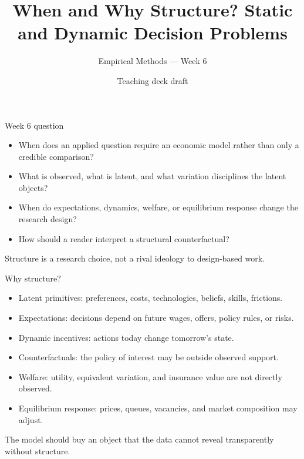 \documentclass[aspectratio=169,11pt]{beamer}
\title{When and Why Structure? Static and Dynamic Decision Problems}
\subtitle{Empirical Methods --- Week 6}
\author{Teaching deck draft}
\date{}
\newcommand{\1}{\mathbf{1}}
\begin{document}
\begin{frame}
  \titlepage
\end{frame}

\begin{frame}{Week 6 question}
\begin{itemize}
    \item When does an applied question require an economic model rather than only a credible comparison?
    \item What is observed, what is latent, and what variation disciplines the latent objects?
    \item When do expectations, dynamics, welfare, or equilibrium response change the research design?
    \item How should a reader interpret a structural counterfactual?
\end{itemize}

\medskip
Structure is a research choice, not a rival ideology to design-based work.
\end{frame}

\begin{frame}{Why structure?}
\begin{itemize}
    \item Latent primitives: preferences, costs, technologies, beliefs, skills, frictions.
    \item Expectations: decisions depend on future wages, offers, policy rules, or risks.
    \item Dynamic incentives: actions today change tomorrow's state.
    \item Counterfactuals: the policy of interest may be outside observed support.
    \item Welfare: utility, equivalent variation, and insurance value are not directly observed.
    \item Equilibrium response: prices, queues, vacancies, and market composition may adjust.
\end{itemize}

\medskip
The model should buy an object that the data cannot reveal transparently without structure.
\end{frame}
\end{document}
